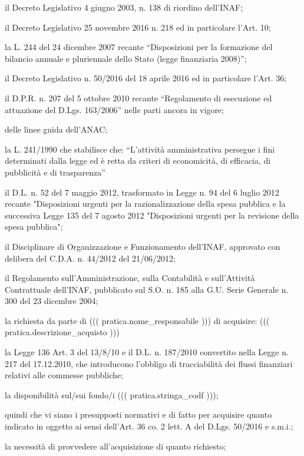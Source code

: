\documentclass[a4paper,12pt]{letter}
\begin{document}
\begin{list}{VALUTATA}{}
\item[VISTO] il Decreto Legislativo 4 giugno 2003, n. 138 di riordino dell'INAF;
\item[VISTO] il Decreto Legislativo 25 novembre 2016 n. 218 ed in particolare l'Art. 10;
\item[VISTA] la L. 244 del 24 dicembre 2007 recante ``Disposizioni per la formazione 
        del bilancio annuale e pluriennale dello Stato (legge finanziaria 2008)''; 
\item[VISTO]  il Decreto Legislativo n. 50/2016 del 18 aprile 2016 ed in particolare
      l'Art. 36;
\item[VISTO] il D.P.R. n. 207 del 5 ottobre 2010 recante ``Regolamento di esecuzione 
        ed attuazione del D.Lgs. 163/2006'' nelle parti ancora in vigore; 
\item[PRESO ATTO] delle linee guida dell'ANAC;
\item[VISTA] la L. 241/1990 che stabilisce che: ``L'attivit\`a amministrativa persegue i 
        fini determinati dalla legge ed \`e retta da criteri di economicit\`a, di 
        efficacia, di pubblicit\`a e di trasparenza''
\item[VISTO] il D.L. n. 52 del 7 maggio 2012, trasformato in Legge n. 94 del 6 luglio 2012 
        recante "Disposizioni urgenti per la razionalizzazione della spesa pubblica 
        e la successiva Legge 135 del 7 agosto 2012 "Disposizioni urgenti per la 
        revisione della spesa pubblica"; 
\item[VISTO] il Disciplinare di Organizzazione e Funzionamento dell'INAF, approvato
        con delibera del C.D.A. n. 44/2012 del 21/06/2012;
\item[VISTO] il Regolamento sull'Amministrazione, sulla Contabilit\`a e sull'Attivit\`a 
        Contrattuale dell'INAF, pubblicato sul S.O. n. 185 alla G.U. Serie Generale 
        n. 300 del 23 dicembre 2004;   
\item[VISTA] la richiesta da parte di ((( pratica.nome_responsabile ))) di  acquisire:
         ((( pratica.descrizione_acquisto ))) \\
\item[VISTA] la Legge 136 Art. 3 del 13/8/10 e il D.L. n. 187/2010 convertito nella Legge 
        n. 217 del 17.12.2010, che introducono l'obbligo di tracciabilit\`a dei flussi 
        finanziari relativi alle commesse pubbliche; 
\item[VISTA] la disponibilit\`a sul/sui fondo/i ((( pratica.stringa_codf ))); 
\item[RITENUTO] quindi che vi siano i presupposti normativi e di fatto per acquisire  
         quanto indicato in oggetto ai sensi dell'Art. 36 co. 2 lett. A del D.Lgs. 50/2016 e s.m.i.;
\item[VALUTATA] la necessit\`a di provvedere all'acquisizione di quanto richiesto; 
\end{list}
\end{document}
